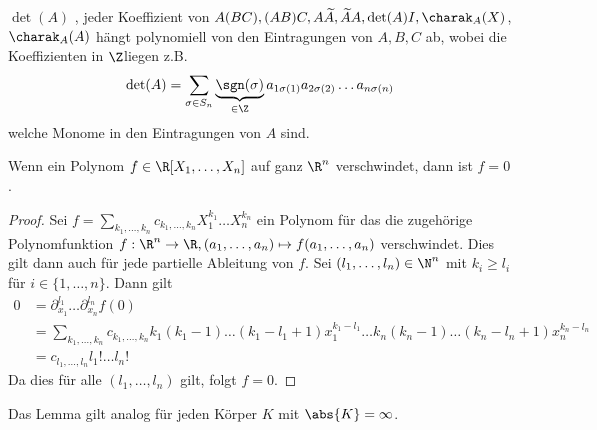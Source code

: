 \begin{remark}
	$\det(A)$ , jeder Koeffizient von $A(BC), (AB)C, A  \widetilde{A}, \widetilde{A} A, \det(A) I, \charak_{A}(X)$, $ \charak_{A}(A)$ 
	hängt polynomiell von den Eintragungen von $A,B,C$ ab, wobei die Koeffizienten in $\Z$liegen z.B.
	\[
		\det(A) = \sum_{\sigma \in S_{n}} \underbrace{\sgn(\sigma)}_{\in \Z}
			a_{1 \sigma(1)} a_{2 \sigma(2)} \ldots a_{n \sigma(n)}
		\]
		welche Monome in den Eintragungen von $A$ sind.
\end{remark}

\begin{lemma}
	Wenn ein Polynom $f \in \R[X_1,\ldots,X_{n}]$ auf ganz $\R^{n}$ verschwindet, dann ist $f=0$.
\end{lemma}

\begin{proof}
	Sei $f= \sum_{k_1,\ldots,k_{n}} c_{k_1,\ldots,k_{n}} X_1^{k_1} \ldots X_{n}^{k_{n}}$ ein Polynom für das die zugehörige Polynomfunktion
	$f: \R^{n} \to \R, (a_1,\ldots,a_{n}) \mapsto f(a_1,\ldots,a_{n})$ verschwindet.
	Dies gilt dann auch für jede partielle Ableitung von $f$.
	Sei $(l_1,\ldots,l_{n}) \in \N^{n}$ mit $k_{i} \geq l_{i}$ für $i \in \{1,\ldots,n\} $. Dann gilt
	\begin{align*}
		0 &= \partial_{x_1}^{l_1} \ldots \partial_{x_{n}}^{l_{n}} f(0)\\
		&= \sum_{k_1,\ldots,k_{n}} c_{k_1,\ldots,k_{n}} k_1 (k_1-1) \ldots (k_1-l_1 +1) x_1^{k_1-l_1} \ldots 
		k_{n} (k_{n} -1) \ldots (k_{n} - l_{n} +1) x_{n}^{k_{n} - l_{n}}\\
		&= c_{l_1,\ldots, l_{n}} l_1! \ldots l_{n}!
	\end{align*}
	Da dies für alle $(l_1,\ldots,l_{n})$ gilt, folgt $f=0$.
\end{proof}

\begin{remark}
	Das Lemma gilt analog für jeden Körper $K$ mit $\abs{K} = \infty$.
\end{remark}

